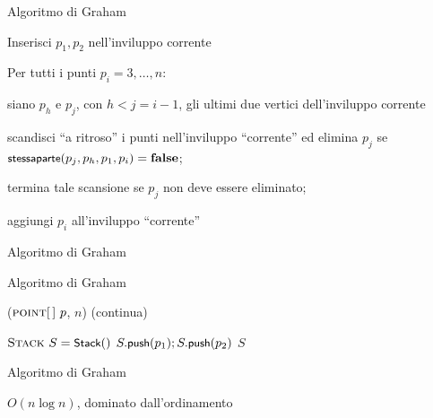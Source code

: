 \begin{frame}{Algoritmo di Graham}

\BIL
\item Inserisci $p_1,p_2$ nell'inviluppo corrente
\item Per tutti i punti $p_i = 3, \ldots, n$:
\BI
\item siano $p_h$ e $p_j$, con $h < j = i-1$, gli ultimi due vertici dell'inviluppo corrente
\item scandisci ``a ritroso'' i punti nell'inviluppo ``corrente'' ed elimina $p_j$ se $\stessaparte(p_j, p_{h}, p_1, p_i) = \FALSE$;
\item termina tale scansione se $p_j$ non deve essere eliminato;
\item aggiungi $p_i$ all'inviluppo “corrente”
\EI
\EIL

\end{frame}

\begin{frame}{Algoritmo di Graham}

\vspace{-12pt}

\end{frame}

\begin{frame}{Algoritmo di Graham}

\begin{Procedure}
\caption[A]{\Stack \graham($\textsc{point}[\,]\ p$, \INTEGER $n$) (continua)}
$\textsc{Stack}\ S = \textsf{{\small Stack}}()$\;
$S.\textsf{{\small push}}(p_1); S.\textsf{{\small push}}(p_2)$\;
\Return $S$\;  
\end{Procedure}


\end{frame}

\begin{frame}{Algoritmo di Graham}


\BIL
\item $O(n \log n)$, dominato dall'ordinamento
\EIL

\end{frame}





